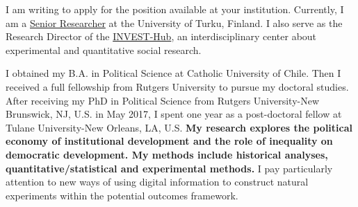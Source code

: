 \vspace{-0.3cm}I am writing to apply for the position available at your institution. Currently, I am a \href{https://www.utu.fi/en/people/hector-bahamonde-norambuena}{Senior Researcher} at the University of Turku, Finland. I also serve as the Research Director of the \href{https://www.utu.fi/en/investhub}{INVEST-Hub}, an interdisciplinary center about experimental and quantitative social research. %

I obtained my B.A. in Political Science at Catholic University of Chile. Then I received a full fellowship from Rutgers University to pursue my doctoral studies. After receiving my PhD in Political Science from Rutgers University-New Brunswick, NJ, U.S. in May 2017, I spent one year as a post-doctoral fellow at Tulane University-New Orleans, LA, U.S. {\bf My research explores the political economy of institutional development and the role of inequality on democratic development. My methods include historical analyses, quantitative/statistical and experimental methods.} I pay particularly attention to new ways of using digital information to construct natural experiments within the potential outcomes framework. 
